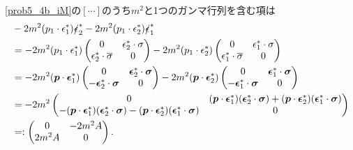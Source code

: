 \eqref{prob5_4b_iM}の$[\cdots]$のうち$m^2$と1つのガンマ行列を含む項は
\begin{align*}
  & -2m^2 (p_1 \cdot \epsilon_1^\ast) \slashed{\epsilon}_2^\ast -2m^2 (p_1 \cdot \epsilon_2^\ast) \slashed{\epsilon}_1^\ast  \\
  &= -2m^2 (p_1 \cdot \epsilon_1^\ast)
  \begin{pmatrix}
    0 & \epsilon_2^\ast \cdot \sigma \\
    \epsilon_2^\ast \cdot \overline\sigma & 0
  \end{pmatrix}
  -2m^2 (p_1 \cdot \epsilon_2^\ast)
  \begin{pmatrix}
    0 & \epsilon_1^\ast \cdot \sigma \\
    \epsilon_1^\ast \cdot \overline\sigma & 0
  \end{pmatrix}
  \\
  &= -2m^2 (\boldsymbol{p} \cdot \boldsymbol{\epsilon}_1^\ast)
  \begin{pmatrix}
    0 & \boldsymbol{\epsilon}_2^\ast \cdot \boldsymbol\sigma \\
    -\boldsymbol{\epsilon}_2^\ast \cdot \boldsymbol\sigma & 0
  \end{pmatrix}
  -2m^2 (\boldsymbol{p} \cdot \boldsymbol{\epsilon}_2^\ast)
  \begin{pmatrix}
    0 & \boldsymbol{\epsilon}_1^\ast \cdot \boldsymbol\sigma \\
    -\boldsymbol{\epsilon}_1^\ast \cdot \boldsymbol\sigma & 0
  \end{pmatrix}
  \\
  &= -2m^2
  \begin{pmatrix}
    0 & (\boldsymbol{p} \cdot \boldsymbol{\epsilon}_1^\ast)(\boldsymbol{\epsilon}_2^\ast \cdot \boldsymbol\sigma)
    + (\boldsymbol{p} \cdot \boldsymbol{\epsilon}_2^\ast)(\boldsymbol{\epsilon}_1^\ast \cdot \boldsymbol\sigma)
    \\
    -(\boldsymbol{p} \cdot \boldsymbol{\epsilon}_1^\ast)(\boldsymbol{\epsilon}_2^\ast \cdot \boldsymbol\sigma)
    - (\boldsymbol{p} \cdot \boldsymbol{\epsilon}_2^\ast)(\boldsymbol{\epsilon}_1^\ast \cdot \boldsymbol\sigma)
    & 0
  \end{pmatrix}
  \\
  & =:
  \begin{pmatrix}
    0 & -2m^2 A \\
    2m^2 A & 0
  \end{pmatrix}
  .
\end{align*}

